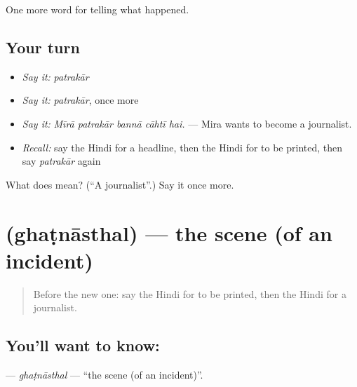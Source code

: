 \begin{grammarlens}[title={What you've built}]
One more word for telling what happened.
\end{grammarlens}

\subsection*{Your turn}
\begin{itemize}
\raggedright
  \item \emph{Say it:} \emph{patrakār}
  \item \emph{Say it:} \emph{patrakār}, once more
  \item \emph{Say it:} \emph{Mīrā patrakār bannā cāhtī hai.} — Mira wants to become a journalist.
  \item \emph{Recall:} say the Hindi for a headline, then the Hindi for to be printed, then say \emph{patrakār} again
\end{itemize}

\begin{tcolorbox}[breakable,colback=teal!4,colframe=teal!35!black,title={Before you move on}]
What does  mean? (\textquotedblleft{}A journalist\textquotedblright{}.) Say it once more.
\end{tcolorbox}
\section[\texorpdfstring{\hi{घटनास्थल} (ghaṭnāsthal)}{घटनास्थल (ghaṭnāsthal)}]{ (ghaṭnāsthal) — the scene (of an incident)}

\label{lesson:HI-C313-ghatnasthal}



\begin{quote}
Before the new one: say the Hindi for to be printed, then the Hindi for a journalist.
\end{quote}

\subsection*{You'll want to know: }
\textbf{} — \emph{ghaṭnāsthal} — \textquotedblleft{}the scene (of an incident)\textquotedblright{}.

\begin{quote}
       
\end{quote}

